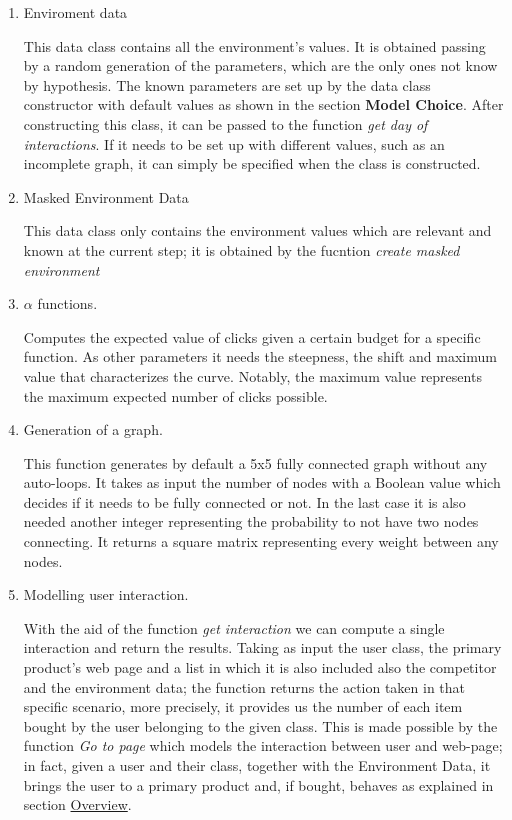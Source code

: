         \begin{enumerate}
            \item Enviroment data
     
                This data class contains all the environment's values. It is obtained passing by a random generation of the parameters, which are the only ones not know by hypothesis. The known parameters are set up by the data class constructor with default values as shown in the section \textbf{Model Choice}. After constructing this class, it can be passed to the function  \textit{get day of interactions}. If it needs to be set up with different values, such as an incomplete graph, it can simply be specified when the class is constructed.
     
            \item Masked Environment Data
     
                This data class only contains the environment values which are relevant and known at the current step; it is obtained by the fucntion \textit{create masked environment} 
    
            \item $\alpha$ functions.
     
                Computes the expected value of clicks given a certain budget for a specific function. As other parameters it needs the steepness, the shift and maximum value that characterizes the curve. Notably, the maximum value represents the maximum expected number of clicks possible.
  
            \item Generation of a graph.
    
                This function generates by default a 5x5 fully connected graph without any auto-loops. It takes as input the number of nodes with a Boolean value which decides if it needs to be fully connected or not. In the last case it is also needed another integer representing the probability to not have two nodes connecting. It returns a square matrix representing every weight between any nodes.
   
            \item Modelling user interaction.
    
                With the aid of the function \textit{get interaction} we can compute a single interaction and return the results. Taking as input the user class, the primary product's web page and a list in which it is also included also the competitor and the environment data; the function returns the action taken in that specific scenario, more precisely, it provides us the number of each item bought by the user belonging to the given class. This is made possible by the function \textit{Go to page} which models the interaction between user and web-page; in fact, given a user and their class, together with the Environment Data, it brings the user to a primary product and, if bought, behaves as explained in section \hyperref[sec:intro_overview]{Overview}.
    

\end{enumerate}
